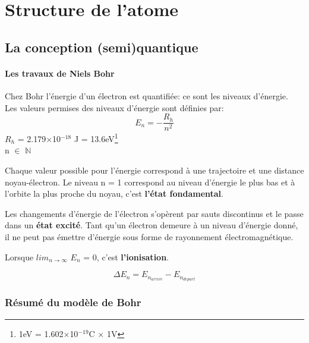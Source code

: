 \documentclass[10pt,a4paper]{book}
\begin{document}
\section{Structure de l'atome}

\subsection{La conception (semi)quantique}

\paragraph{Les travaux de Niels Bohr} Chez Bohr l'énergie d'un électron est quantifiée: ce sont les niveaux d'énergie. \\
Les valeurs permises des niveaux d'énergie sont définies par:
\begin{displaymath}
E_n = - \frac{R_h}{n^2}
\end{displaymath}
$R_h$ = 2.179$\times$10$^{-18}$ J = 13.6eV\footnote{1eV = 1.602$\times$10$^{-19}$C $\times$ 1V}\\
n $\in$ $\mathbb{N}$ \par
Chaque valeur possible pour l'énergie correspond à une trajectoire et une distance noyau-électron. Le niveau n = 1 correspond au niveau d'énergie le plus bas et à l'orbite la plus proche du noyau, c'est \textbf{l'état fondamental}.\par
Les changements d'énergie de l'électron s'opèrent par sauts discontinus et le passe dans un \textbf{état excité}. Tant qu'un électron demeure à un niveau d'énergie donné, il ne peut pas émettre d'énergie sous forme de rayonnement électromagnétique. \par
Lorsque $lim_{n \rightarrow \infty}$ $E_n$ = 0, c'est \textbf{l'ionisation}. \par
\begin{displaymath}
{\Delta}E_n = E_{n_{arriv\acute{e}}} - E_{n_{d\acute{e}part}}
\end{displaymath}

\subsubsection{Résumé du modèle de Bohr}
\end{document}
